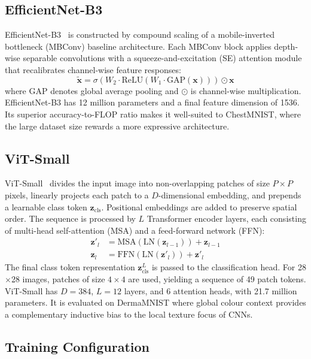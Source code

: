 \subsection{EfficientNet-B3}

EfficientNet-B3~\cite{tan2019efficientnet} is constructed by compound scaling of a mobile-inverted bottleneck (MBConv) baseline architecture. Each MBConv block applies depth-wise separable convolutions with a squeeze-and-excitation (SE) attention module that recalibrates channel-wise feature responses:
\begin{equation}
    \tilde{\mathbf{x}} = \sigma(W_2 \cdot \text{ReLU}(W_1 \cdot \text{GAP}(\mathbf{x}))) \odot \mathbf{x}
\end{equation}
where $\text{GAP}$ denotes global average pooling and $\odot$ is channel-wise multiplication. EfficientNet-B3 has 12 million parameters and a final feature dimension of 1536. Its superior accuracy-to-FLOP ratio makes it well-suited to ChestMNIST, where the large dataset size rewards a more expressive architecture.

\subsection{ViT-Small}

ViT-Small~\cite{dosovitskiy2020image} divides the input image into non-overlapping patches of size $P \times P$ pixels, linearly projects each patch to a $D$-dimensional embedding, and prepends a learnable class token $\mathbf{z}_{\text{cls}}$. Positional embeddings are added to preserve spatial order. The sequence is processed by $L$ Transformer encoder layers, each consisting of multi-head self-attention (MSA) and a feed-forward network (FFN):
\begin{align}
    \mathbf{z}'_l &= \text{MSA}(\text{LN}(\mathbf{z}_{l-1})) + \mathbf{z}_{l-1} \\
    \mathbf{z}_l  &= \text{FFN}(\text{LN}(\mathbf{z}'_l)) + \mathbf{z}'_l
\end{align}
The final class token representation $\mathbf{z}_{\text{cls}}^L$ is passed to the classification head. For 28$\times$28 images, patches of size $4 \times 4$ are used, yielding a sequence of 49 patch tokens. ViT-Small has $D=384$, $L=12$ layers, and 6 attention heads, with 21.7 million parameters. It is evaluated on DermaMNIST where global colour context provides a complementary inductive bias to the local texture focus of CNNs.

\subsection{Training Configuration}

